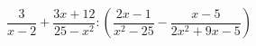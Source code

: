 \begin{ex}[type=calculate_expression]
	\begin{condition}
		\( \dfrac{3}{x-2}+\dfrac{3x+12}{25-x^2}:\left( \dfrac{2x-1}{x^2-25}-\dfrac{x-5}{2x^2+9x-5} \right) \)
	\end{condition}
\end{ex}